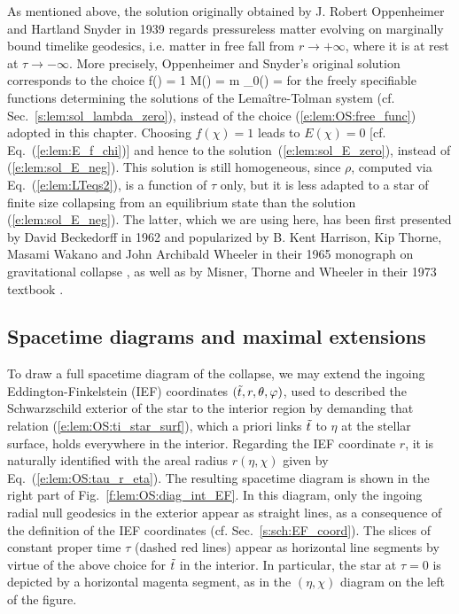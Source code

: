 \begin{hist}
As mentioned above, the solution originally obtained by J. Robert Oppenheimer
and Hartland Snyder in 1939 \cite{OppenS1939}
regards pressureless matter evolving on marginally bound timelike geodesics, i.e. matter
in free fall from $r\to +\infty$, where it is at rest at $\tau\to -\infty$.
More precisely, Oppenheimer and Snyder's original solution corresponds to the choice
\be
    f(\chi) = 1 \qquad
    M(\chi) = m 
    \qand \tau_0(\chi) = 
\ee
for the freely specifiable functions determining the solutions of the Lemaître-Tolman system
(cf. Sec.~\ref{s:lem:sol_lambda_zero}), instead of the choice (\ref{e:lem:OS:free_func})
adopted in this chapter. Choosing $f(\chi)=1$ leads to
$E(\chi) = 0$ [cf. Eq.~(\ref{e:lem:E_f_chi})]
and hence to the solution~(\ref{e:lem:sol_E_zero}), instead of (\ref{e:lem:sol_E_neg}).
This solution is still homogeneous, since $\rho$, computed via Eq.~(\ref{e:lem:LTeqs2}),
is a function of $\tau$ only, but it is less adapted
to a star of finite size collapsing from an equilibrium state than the
solution (\ref{e:lem:sol_E_neg}). The latter, which we are using here, has been first presented
by David Beckedorff in 1962 \cite{Becke62} and popularized by
B. Kent Harrison, Kip Thorne, Masami Wakano
and John Archibald Wheeler in their 1965 monograph on gravitational collapse
\cite{HarriTWW65}, as well as by Misner, Thorne and Wheeler in their 1973 textbook \cite{MisneTW73}.
\end{hist}


\subsection{Spacetime diagrams and maximal extensions}

To draw a full spacetime diagram of the collapse, we may extend the ingoing
Eddington-Finkelstein (IEF) coordinates $({\tilde t},r,\theta,\varphi)$, used to described the
Schwarzschild exterior of the star to the interior region by demanding
that relation (\ref{e:lem:OS:ti_star_surf}), which a priori links ${\tilde t}$
to $\eta$ at the stellar surface, holds everywhere in the interior.
Regarding the IEF coordinate $r$, it is naturally identified with the areal
radius $r(\eta,\chi)$ given by Eq.~(\ref{e:lem:OS:tau_r_eta}).
The resulting spacetime diagram is shown in the right part of Fig.~\ref{f:lem:OS:diag_int_EF}.
In this diagram, only the ingoing radial null geodesics in the exterior appear
as straight lines, as a consequence of the definition of the IEF coordinates
(cf. Sec.~\ref{s:sch:EF_coord}). The slices of constant proper time $\tau$
(dashed red lines) appear as horizontal line segments by virtue of the above
choice for ${\tilde t}$ in the interior. In particular, the star at $\tau = 0$
is depicted by a horizontal magenta segment, as in the $(\eta,\chi)$ diagram
on the left of the figure.

